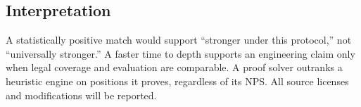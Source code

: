 \subsection{Interpretation}
A statistically positive match would support ``stronger under this protocol,'' not ``universally stronger.'' A faster time to depth supports an engineering claim only when legal coverage and evaluation are comparable. A proof solver outranks a heuristic engine on positions it proves, regardless of its NPS. All source licenses and modifications will be reported.
